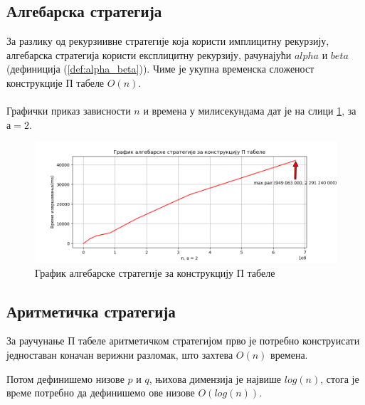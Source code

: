 \documentclass[a4paper]{article}
\begin{document}
\subsection{Алгебарска стратегија}

За разлику од рекурзиивне стратегије која користи имплицитну рекурзију, алгебарска стратегија користи експлицитну рекурзију, рачунајући $ alpha $ и $ beta $ (дефиниција (\ref{def:alpha_beta})). Чиме је укупна временска сложеност конструкције П табеле $ O(n) $.\\



\leavevmode\\
Графички приказ зависности $ n $ и времена у милисекундама дат је на слици \ref{fig:algebraic}, за $ а = 2 $.

\begin{figure}[H]
	\caption{График алгебарске стратегије за конструкцију П табеле}
	\label{fig:algebraic}
	\begin{center}
		\includegraphics[width=\textwidth]{algebraic.png}
	\end{center}
\end{figure}

\subsection{Аритметичка стратегија}

За раучунање П табеле аритметичком стратегијом прво је потребно конструисати једноставан коначан верижни разломак, што захтева $ O(n) $ времена. 

Потом дефинишемо низове $ p $ и $ q $, њихова димензија је највише $ log(n) $, стога је врeме потребно да дефинишемо ове низове $ O(log(n)) $.
\end{document}

